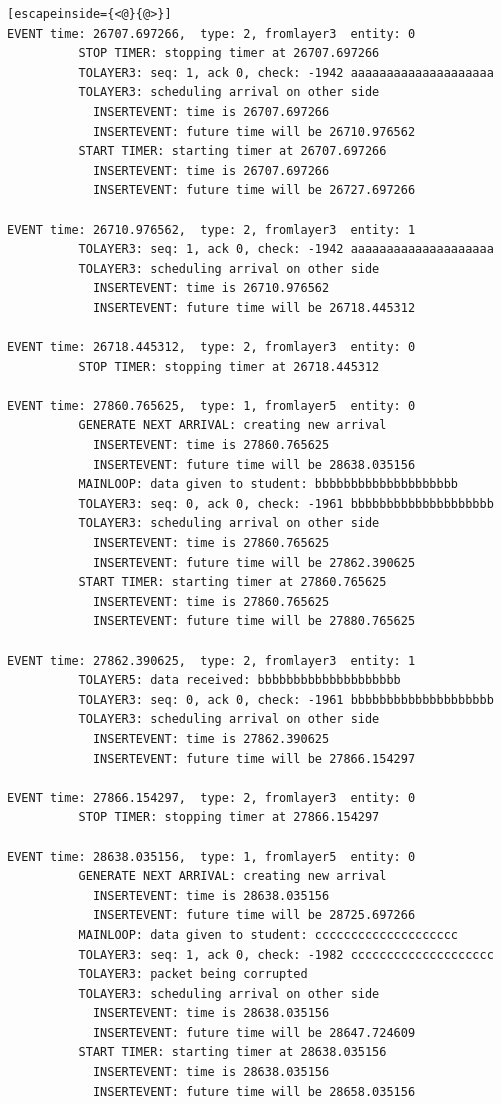 \documentclass[paper=a4, fontsize=11pt]{scrartcl}
\numberwithin{equation}{section}		%
\numberwithin{figure}{section}			%
\numberwithin{table}{section}				%
\begin{document}
\begin{lstlisting}[escapeinside={<@}{@>}]
EVENT time: 26707.697266,  type: 2, fromlayer3  entity: 0
          STOP TIMER: stopping timer at 26707.697266
          TOLAYER3: seq: 1, ack 0, check: -1942 aaaaaaaaaaaaaaaaaaaa
          TOLAYER3: scheduling arrival on other side
            INSERTEVENT: time is 26707.697266
            INSERTEVENT: future time will be 26710.976562
          START TIMER: starting timer at 26707.697266
            INSERTEVENT: time is 26707.697266
            INSERTEVENT: future time will be 26727.697266

EVENT time: 26710.976562,  type: 2, fromlayer3  entity: 1
          TOLAYER3: seq: 1, ack 0, check: -1942 aaaaaaaaaaaaaaaaaaaa
          TOLAYER3: scheduling arrival on other side
            INSERTEVENT: time is 26710.976562
            INSERTEVENT: future time will be 26718.445312

EVENT time: 26718.445312,  type: 2, fromlayer3  entity: 0
          STOP TIMER: stopping timer at 26718.445312

EVENT time: 27860.765625,  type: 1, fromlayer5  entity: 0
          GENERATE NEXT ARRIVAL: creating new arrival
            INSERTEVENT: time is 27860.765625
            INSERTEVENT: future time will be 28638.035156
          MAINLOOP: data given to student: bbbbbbbbbbbbbbbbbbbb
          TOLAYER3: seq: 0, ack 0, check: -1961 bbbbbbbbbbbbbbbbbbbb
          TOLAYER3: scheduling arrival on other side
            INSERTEVENT: time is 27860.765625
            INSERTEVENT: future time will be 27862.390625
          START TIMER: starting timer at 27860.765625
            INSERTEVENT: time is 27860.765625
            INSERTEVENT: future time will be 27880.765625

EVENT time: 27862.390625,  type: 2, fromlayer3  entity: 1
          TOLAYER5: data received: bbbbbbbbbbbbbbbbbbbb
          TOLAYER3: seq: 0, ack 0, check: -1961 bbbbbbbbbbbbbbbbbbbb
          TOLAYER3: scheduling arrival on other side
            INSERTEVENT: time is 27862.390625
            INSERTEVENT: future time will be 27866.154297

EVENT time: 27866.154297,  type: 2, fromlayer3  entity: 0
          STOP TIMER: stopping timer at 27866.154297

EVENT time: 28638.035156,  type: 1, fromlayer5  entity: 0
          GENERATE NEXT ARRIVAL: creating new arrival
            INSERTEVENT: time is 28638.035156
            INSERTEVENT: future time will be 28725.697266
          MAINLOOP: data given to student: cccccccccccccccccccc
          TOLAYER3: seq: 1, ack 0, check: -1982 cccccccccccccccccccc
          TOLAYER3: packet being corrupted
          TOLAYER3: scheduling arrival on other side
            INSERTEVENT: time is 28638.035156
            INSERTEVENT: future time will be 28647.724609
          START TIMER: starting timer at 28638.035156
            INSERTEVENT: time is 28638.035156
            INSERTEVENT: future time will be 28658.035156


\end{lstlisting}
\end{document}
